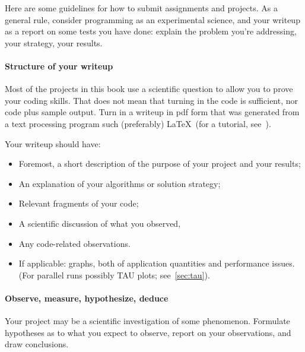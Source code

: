 
Here are some guidelines for how to submit assignments and projects.
As a general rule, consider programming as an experimental science,
and your writeup as a report on some tests you have done: explain
the problem you're addressing, your strategy, your results.

\paragraph*{\bf Structure of your writeup}

Most of the projects in this book use a scientific question to allow
you to prove your coding skills.
That does not mean that turning in the code is sufficient, nor code plus sample output.
Turn in a writeup in pdf form that was generated from a text
processing program such 
(preferably) \LaTeX\ (for a tutorial, see~).

Your writeup should have:
\begin{itemize}
\item Foremost, a short description of the purpose of your project and your results;
\item An explanation of your algorithms or solution strategy;
\item Relevant fragments of your code;
\item A scientific discussion of what you observed,
\item Any code-related observations.
\item If applicable: graphs, both of application quantities and
performance issues.
(For parallel runs possibly TAU plots; see~\ref{sec:tau}).
\end{itemize}

\paragraph*{Observe, measure, hypothesize, deduce}

Your project may be a scientific investigation of some
phenomenon. Formulate hypotheses as to what you expect to observe,
report on your observations, and draw conclusions.

